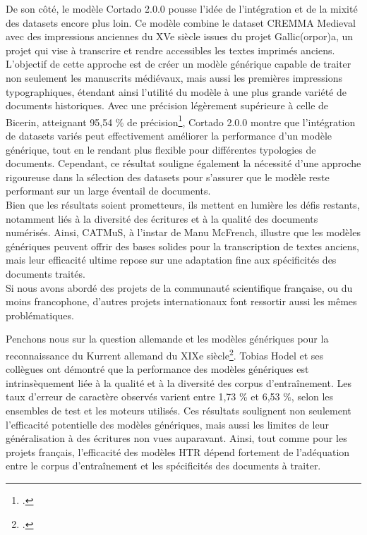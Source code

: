 \documentclass[a4paper,12pt,twoside]{book}
\begin{document}
	De son côté, le modèle Cortado 2.0.0 pousse l’idée de l’intégration et de la mixité des datasets encore plus loin. Ce modèle combine le dataset CREMMA Medieval avec des impressions anciennes du XVe siècle issues du projet Gallic(orpor)a, un projet qui vise à transcrire et rendre accessibles les textes imprimés anciens. L’objectif de cette approche est de créer un modèle générique capable de traiter non seulement les manuscrits médiévaux, mais aussi les premières impressions typographiques, étendant ainsi l’utilité du modèle à une plus grande variété de documents historiques. Avec une précision légèrement supérieure à celle de Bicerin, atteignant 95,54 \% de précision\footcite{pinche_htr_2022}, Cortado 2.0.0 montre que l’intégration de datasets variés peut effectivement améliorer la performance d’un modèle générique, tout en le rendant plus flexible pour différentes typologies de documents. Cependant, ce résultat souligne également la nécessité d’une approche rigoureuse dans la sélection des datasets pour s’assurer que le modèle reste performant sur un large éventail de documents.
	\\
	
	Bien que les résultats soient prometteurs, ils mettent en lumière les défis restants, notamment liés à la diversité des écritures et à la qualité des documents numérisés. Ainsi, CATMuS, à l’instar de Manu McFrench, illustre que les modèles génériques peuvent offrir des bases solides pour la transcription de textes anciens, mais leur efficacité ultime repose sur une adaptation fine aux spécificités des documents traités.
	\\
	
	Si nous avons abordé des projets de la communauté scientifique française, ou du moins francophone, d’autres projets internationaux font ressortir aussi les mêmes problématiques. 
	
	Penchons nous sur la question allemande et les modèles génériques pour la reconnaissance du Kurrent allemand du XIXe siècle\footcite{hodel_general_2021}. Tobias Hodel et ses collègues ont démontré que la performance des modèles génériques est intrinsèquement liée à la qualité et à la diversité des corpus d’entraînement. Les taux d’erreur de caractère observés varient entre 1,73 \% et 6,53 \%, selon les ensembles de test et les moteurs utilisés. Ces résultats soulignent non seulement l’efficacité potentielle des modèles génériques, mais aussi les limites de leur généralisation à des écritures non vues auparavant. Ainsi, tout comme pour les projets français, l’efficacité des modèles HTR dépend fortement de l’adéquation entre le corpus d’entraînement et les spécificités des documents à traiter. 
	
\end{document}
